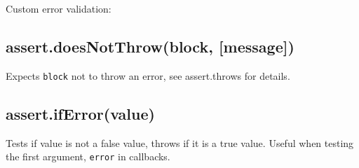 Custom error validation:

\begin{Shaded}
\begin{Highlighting}[]
\NormalTok{(}
  \NormalTok{() \{}
      \NormalTok{(}\NormalTok{);}
  \NormalTok{\},}
      
       \NormalTok{;}
    \NormalTok{\}}
  \NormalTok{\},}
\NormalTok{);}
\end{Highlighting}
\end{Shaded}

\subsection{assert.doesNotThrow(block,
{[}message{]})}\label{assert.doesnotthrowblock-message}

Expects \texttt{block} not to throw an error, see assert.throws for
details.

\subsection{assert.ifError(value)}\label{assert.iferrorvalue}

Tests if value is not a false value, throws if it is a true value.
Useful when testing the first argument, \texttt{error} in callbacks.
